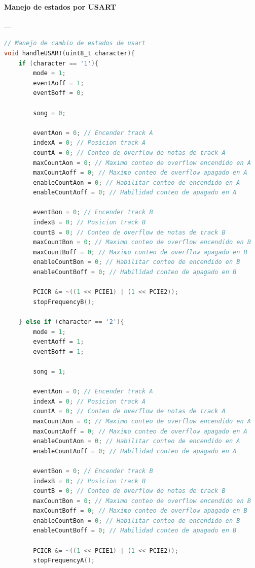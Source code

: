 \paragraph{Manejo de estados por USART}\label{anexo:piano_USART}---\\
\begin{lstlisting}[language=C, caption={Manejo de estados por USART}]
// Manejo de cambio de estados de usart
void handleUSART(uint8_t character){
	if (character == '1'){
		mode = 1;
		eventAoff = 1;
		eventBoff = 0;
		
		song = 0;
		
		eventAon = 0; // Encender track A
		indexA = 0; // Posicion track A
		countA = 0; // Conteo de overflow de notas de track A
		maxCountAon = 0; // Maximo conteo de overflow encendido en A
		maxCountAoff = 0; // Maximo conteo de overflow apagado en A
		enableCountAon = 0; // Habilitar conteo de encendido en A
		enableCountAoff = 0; // Habilidad conteo de apagado en A
		
		eventBon = 0; // Encender track B
		indexB = 0; // Posicion track B
		countB = 0; // Conteo de overflow de notas de track B
		maxCountBon = 0; // Maximo conteo de overflow encendido en B
		maxCountBoff = 0; // Maximo conteo de overflow apagado en B
		enableCountBon = 0; // Habilitar conteo de encendido en B
		enableCountBoff = 0; // Habilidad conteo de apagado en B
		
		PCICR &= ~((1 << PCIE1) | (1 << PCIE2));
		stopFrequencyB();
		
	} else if (character == '2'){
		mode = 1;
		eventAoff = 1;
		eventBoff = 1;
		
		song = 1;
		
		eventAon = 0; // Encender track A
		indexA = 0; // Posicion track A
		countA = 0; // Conteo de overflow de notas de track A
		maxCountAon = 0; // Maximo conteo de overflow encendido en A
		maxCountAoff = 0; // Maximo conteo de overflow apagado en A
		enableCountAon = 0; // Habilitar conteo de encendido en A
		enableCountAoff = 0; // Habilidad conteo de apagado en A
		
		eventBon = 0; // Encender track B
		indexB = 0; // Posicion track B
		countB = 0; // Conteo de overflow de notas de track B
		maxCountBon = 0; // Maximo conteo de overflow encendido en B
		maxCountBoff = 0; // Maximo conteo de overflow apagado en B
		enableCountBon = 0; // Habilitar conteo de encendido en B
		enableCountBoff = 0; // Habilidad conteo de apagado en B
		
		PCICR &= ~((1 << PCIE1) | (1 << PCIE2));
		stopFrequencyA();


\end{lstlisting}
